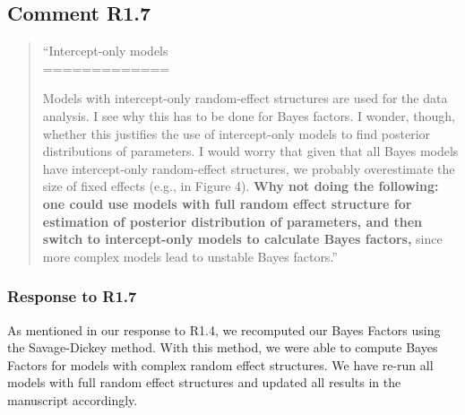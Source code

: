 \documentclass[12pt]{article}
\begin{document}
\subsection*{Comment R1.7}
\begin{quote}
``Intercept-only models\\
=============

Models with intercept-only random-effect structures are used for the data analysis. I see why this has to be done for Bayes factors. I wonder, though, whether this justifies the use of intercept-only models to find posterior distributions of parameters. I would worry that given that all Bayes models have intercept-only random-effect structures, we probably overestimate the size of fixed effects (e.g., in Figure 4). \textbf{Why not doing the following: one could use models with full random effect structure for estimation of posterior distribution of parameters, and then switch to intercept-only models to calculate Bayes factors,} since more complex models lead to unstable Bayes factors.''\end{quote}


\subsubsection*{Response to R1.7}
As mentioned in our response to R1.4, we recomputed our Bayes Factors using the Savage-Dickey method. With this method, we were able to compute Bayes Factors for models with complex random effect structures. We have re-run all models with full random effect structures and updated all results in the manuscript accordingly.
\end{document}
